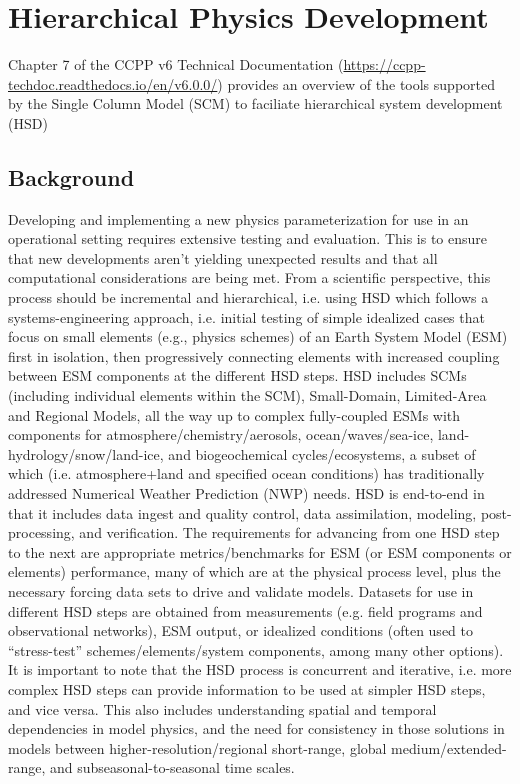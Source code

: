 \chapter{Hierarchical Physics Development}
\label{chapter: Hierarchical_Physics_Development}

Chapter 7 of the CCPP v6 Technical Documentation (\url{https://ccpp-techdoc.readthedocs.io/en/v6.0.0/}) provides an overview of the tools supported by the Single Column Model (SCM) to faciliate hierarchical system development (HSD)

\section{Background}

Developing and implementing a new physics parameterization for use in an operational setting requires extensive testing and evaluation. This is to ensure that new developments aren’t yielding unexpected results and that all computational considerations are being met. From a scientific perspective, this process should be incremental and hierarchical, i.e. using HSD which follows a systems-engineering approach, i.e. initial testing of simple idealized cases that focus on small elements (e.g., physics schemes) of an Earth System Model (ESM) first in isolation, then progressively connecting elements with increased coupling between ESM components at the different HSD steps. HSD includes SCMs (including individual elements within the SCM), Small-Domain, Limited-Area and Regional Models, all the way up to complex fully-coupled ESMs with components for atmosphere/chemistry/aerosols, ocean/waves/sea-ice, land-hydrology/snow/land-ice, and biogeochemical cycles/ecosystems, a subset of which (i.e. atmosphere+land and specified ocean conditions) has traditionally addressed Numerical Weather Prediction (NWP) needs. HSD is end-to-end in that it includes data ingest and quality control, data assimilation, modeling, post-processing, and verification. The requirements for advancing from one HSD step to the next are appropriate metrics/benchmarks for ESM (or ESM components or elements) performance, many of which are at the physical process level, plus the necessary forcing data sets to drive and validate models. Datasets for use in different HSD steps are obtained from measurements (e.g. field programs and observational networks), ESM output, or idealized conditions (often used to “stress-test” schemes/elements/system components, among many other options). It is important to note that the HSD process is concurrent and iterative, i.e. more complex HSD steps can provide information to be used at simpler HSD steps, and vice versa. This also includes understanding spatial and temporal dependencies in model physics, and the need for consistency in those solutions in models between higher-resolution/regional short-range, global medium/extended-range, and subseasonal-to-seasonal time scales.

